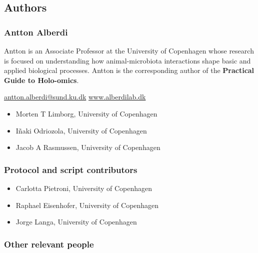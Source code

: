 \documentclass[
]{book}
\providecommand{\tightlist}{%
  \setlength{\itemsep}{0pt}\setlength{\parskip}{0pt}}
\begin{document}
\hypertarget{authors}{%
\subsection*{Authors}\label{authors}}

\hypertarget{antton-alberdi}{%
\subsubsection*{Antton Alberdi}\label{antton-alberdi}}

Antton is an Associate Professor at the University of Copenhagen whose research is focused on understanding how animal-microbiota interactions shape basic and applied biological processes. Antton is the corresponding author of the \textbf{Practical Guide to Holo-omics}.

\url{antton.alberdi@sund.ku.dk} \textbar{} \url{www.alberdilab.dk}

\begin{itemize}
\tightlist
\item
  Morten T Limborg, University of Copenhagen
\item
  Iñaki Odriozola, University of Copenhagen
\item
  Jacob A Rasmussen, University of Copenhagen
\end{itemize}

\hypertarget{protocol-and-script-contributors}{%
\subsubsection*{Protocol and script contributors}\label{protocol-and-script-contributors}}

\begin{itemize}
\tightlist
\item
  Carlotta Pietroni, University of Copenhagen
\item
  Raphael Eisenhofer, University of Copenhagen
\item
  Jorge Langa, University of Copenhagen
\end{itemize}

\hypertarget{other-relevant-people}{%
\subsubsection*{Other relevant people}\label{other-relevant-people}}
\end{document}
